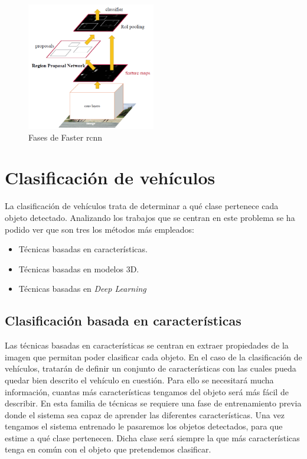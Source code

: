 \begin{figure}[H]
  \begin{center}
    \includegraphics[width=0.5\textwidth]{figures/Estado_arte/faster_rcnn.png}
		\caption{Fases de Faster \acrshort{rcnn}}
		\label{fig.fast_rcnn}
		\end{center}
\end{figure}

\section{Clasificación de vehículos}

La clasificación de vehículos trata de determinar a qué clase pertenece cada objeto detectado. Analizando los trabajos que se centran en este problema se ha podido ver que son tres los métodos más empleados:
\begin{itemize}
    \item Técnicas basadas en características.
    \item Técnicas basadas en modelos 3D.
    \item Técnicas basadas en \textit{Deep Learning}
\end{itemize}

\subsection{Clasificación basada en características}
Las técnicas basadas en características se centran en extraer propiedades de la imagen que permitan poder clasificar cada objeto. En el caso de la clasificación de vehículos, tratarán de definir un conjunto de características con las cuales pueda quedar bien descrito el vehículo en cuestión. Para ello se necesitará mucha información, cuantas más características tengamos del objeto será más fácil de describir. En esta familia de técnicas se requiere una fase de entrenamiento previa donde el sistema sea capaz de aprender las diferentes características. Una vez tengamos el sistema entrenado le pasaremos los objetos detectados, para que estime a qué clase pertenecen. Dicha clase será siempre la que más características tenga en común con el objeto que pretendemos clasificar.
 
